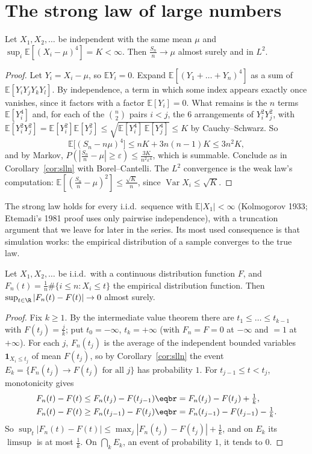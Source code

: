 \section{The strong law of large numbers}

\begin{theorem}\label{thm:slln4}
Let $X_1,X_2,\ldots$ be independent with the same mean $\mu$ and $\sup_i\mathbb E[(X_i-\mu)^4]=K<\infty$. Then $\frac{S_n}n\to\mu$ almost surely and in $L^2$.
\end{theorem}
\begin{proof}
Let $Y_i=X_i-\mu$, so $\mathbb E Y_i=0$. Expand $\mathbb E[(Y_1+\dots+Y_n)^4]$ as a sum of $\mathbb E[Y_iY_jY_kY_l]$. By independence, a term in which some index
appears exactly once vanishes, since it factors with a factor $\mathbb E[Y_i]=0$. What remains is the $n$ terms $\mathbb E[Y_i^4]$ and, for each of the
$\binom n2$ pairs $i<j$, the $6$ arrangements of $Y_i^2Y_j^2$, with $\mathbb E[Y_i^2Y_j^2]=\mathbb E[Y_i^2]\mathbb E[Y_j^2]\le\sqrt{\mathbb E[Y_i^4]\,\mathbb E[Y_j^4]}\le K$ by Cauchy--Schwarz.
So
\[
\mathbb E\bigl[(S_n-n\mu)^4\bigr]\le nK+3n(n-1)K\le3n^2K,
\]
and by Markov, $P(|\frac{S_n}n-\mu|\ge\varepsilon)\le\frac{3K}{n^2\varepsilon^4}$, which is summable. Conclude as in Corollary~\ref{cor:slln} with Borel--Cantelli. The $L^2$
convergence is the weak law's computation: $\mathbb E[(\frac{S_n}n-\mu)^2]\le\frac{\sqrt K}n$, since $\operatorname{Var}X_i\le\sqrt K$.
\end{proof}

The strong law holds for every i.i.d.\ sequence with $\mathbb E|X_1|<\infty$ (Kolmogorov 1933; Etemadi's 1981 proof uses only
pairwise independence), with a truncation argument that we leave for later in the series. Its most used consequence
is that simulation works: the empirical distribution of a sample converges to the true law.

\begin{theorem}\label{thm:gc}
Let $X_1,X_2,\ldots$ be i.i.d.\ with a continuous distribution function $F$, and $F_n(t)=\frac1n\#\{i\le n:X_i\le t\}$ the empirical distribution
function. Then $\sup_{t\in\R}|F_n(t)-F(t)|\to0$ almost surely.
\end{theorem}
\begin{proof}
Fix $k\ge1$. By the intermediate value theorem there are $t_1\le\dots\le t_{k-1}$ with $F(t_j)=\frac jk$; put $t_0=-\infty$, $t_k=+\infty$ (with $F_n=F=0$ at
$-\infty$ and $=1$ at $+\infty$). For each $j$, $F_n(t_j)$ is the average of the independent bounded variables $\mathbf 1_{X_i\le t_j}$ of mean $F(t_j)$, so by
Corollary~\ref{cor:slln} the event $E_k=\{F_n(t_j)\to F(t_j)\text{ for all }j\}$ has probability $1$. For $t_{j-1}\le t<t_j$, monotonicity gives
\[
\begin{aligned}F_n(t)-F(t)&\le F_n(t_j)-F(t_{j-1})\eqbr=F_n(t_j)-F(t_j)+\tfrac1k,\\
F_n(t)-F(t)&\ge F_n(t_{j-1})-F(t_j)\eqbr=F_n(t_{j-1})-F(t_{j-1})-\tfrac1k.\end{aligned}
\]
So $\sup_t|F_n(t)-F(t)|\le\max_j|F_n(t_j)-F(t_j)|+\frac1k$, and on $E_k$ its $\limsup$ is at most $\frac1k$. On $\bigcap_kE_k$, an event of probability $1$, it tends to $0$.
\end{proof}

